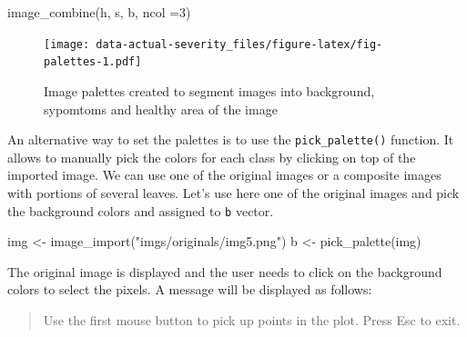\documentclass[
  letterpaper,
]{book}
\newenvironment{Shaded}{\begin{snugshade}}{\end{snugshade}}
\newcommand{\AttributeTok}[1]{\textcolor[rgb]{0.40,0.45,0.13}{#1}}
\newcommand{\DecValTok}[1]{\textcolor[rgb]{0.68,0.00,0.00}{#1}}
\newcommand{\FunctionTok}[1]{\textcolor[rgb]{0.28,0.35,0.67}{#1}}
\newcommand{\NormalTok}[1]{\textcolor[rgb]{0.00,0.23,0.31}{#1}}
\newcommand{\OtherTok}[1]{\textcolor[rgb]{0.00,0.23,0.31}{#1}}
\newcommand{\StringTok}[1]{\textcolor[rgb]{0.13,0.47,0.30}{#1}}
\begin{document}
\begin{Shaded}
\begin{Highlighting}[]
\FunctionTok{image\_combine}\NormalTok{(h, s, b, }\AttributeTok{ncol =}\DecValTok{3}\NormalTok{)}
\end{Highlighting}
\end{Shaded}

\begin{figure}

\texttt{[image: data-actual-severity\_files/figure-latex/fig-palettes-1.pdf]} \hfill{}

\caption{\label{fig-palettes}Image palettes created to segment images
into background, sypomtoms and healthy area of the image}

\end{figure}

An alternative way to set the palettes is to use the
\texttt{pick\_palette()} function. It allows to manually pick the colors
for each class by clicking on top of the imported image. We can use one
of the original images or a composite images with portions of several
leaves. Let's use here one of the original images and pick the
background colors and assigned to \texttt{b} vector.

\begin{Shaded}
\begin{Highlighting}[]
\NormalTok{img }\OtherTok{\textless{}{-}} \FunctionTok{image\_import}\NormalTok{(}\StringTok{"imgs/originals/img5.png"}\NormalTok{)}
\NormalTok{b }\OtherTok{\textless{}{-}} \FunctionTok{pick\_palette}\NormalTok{(img)}
\end{Highlighting}
\end{Shaded}

The original image is displayed and the user needs to click on the
background colors to select the pixels. A message will be displayed as
follows:

\begin{quote}
Use the first mouse button to pick up points in the plot. Press Esc to
exit.
\end{quote}
\end{document}
